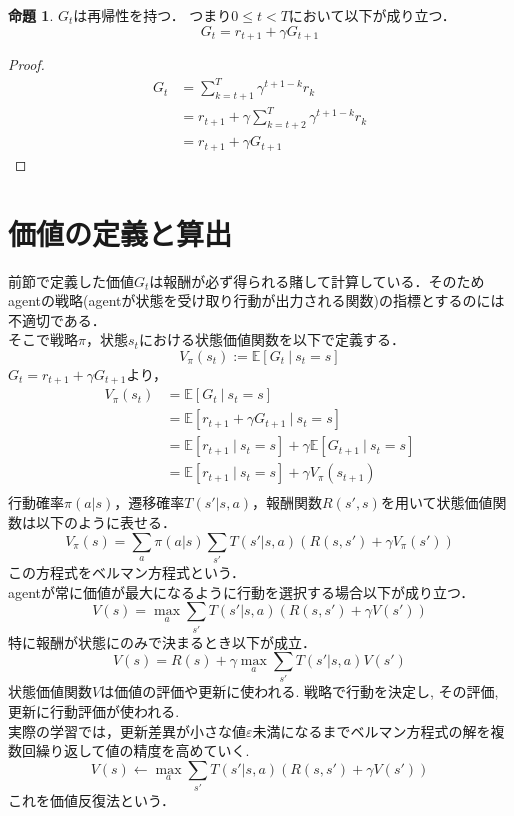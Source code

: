\documentclass[a4paper,12pt]{jsreport}
\theoremstyle{definition}
\newtheorem{prop}{命題}
\begin{document}
\begin{prop}
    $G_t$は再帰性を持つ．
    つまり$0\leq t<T$において以下が成り立つ．
    \begin{equation}
        G_t=r_{t+1}+\gamma G_{t+1}
    \end{equation}
\end{prop}

\begin{proof}  
    \begin{align}
        G_t&=\sum_{k=t+1}^T \gamma^{t+1-k} r_k\\
        &=r_{t+1}+\gamma\sum_{k=t+2}^T \gamma^{t+1-k} r_k\\
        &=r_{t+1}+\gamma G_{t+1}
    \end{align}
\end{proof}

\section{価値の定義と算出}
前節で定義した価値$G_t$は報酬が必ず得られる賭して計算している．そのためagentの戦略(agentが状態を受け取り行動が出力される関数)の指標とするのには不適切である．\\
そこで戦略$\pi$，状態$s_t$における状態価値関数を以下で定義する．
\begin{equation}
    V_\pi(s_t):=\mathbb{E}[G_t\ |\ s_t=s]
\end{equation}
$G_t=r_{t+1}+\gamma G_{t+1}$より，
\begin{align}
    V_\pi(s_t)&=\mathbb{E}[G_t\ |\ s_t=s]\\
    &=\mathbb{E}[r_{t+1}+\gamma G_{t+1}\ |\ s_t=s]\\
    &=\mathbb{E}[r_{t+1}\ |\ s_t=s]+\gamma\mathbb{E}[G_{t+1}\ |\ s_t=s]\\
    &=\mathbb{E}[r_{t+1}\ |\ s_t=s]+\gamma V_\pi (s_{t+1})\\
\end{align}
行動確率$\pi(a|s)$，遷移確率$T(s'|s,a)$，報酬関数$R(s',s)$を用いて状態価値関数は以下のように表せる．
\begin{equation}
    V_\pi(s)=\sum_a\pi(a|s)\sum_{s'}T(s'|s,a)(R(s,s')+\gamma V_\pi(s'))
\end{equation}
この方程式をベルマン方程式という．\\
agentが常に価値が最大になるように行動を選択する場合以下が成り立つ．
\begin{equation}
    V(s)=\max_a\sum_{s'}T(s'|s,a)(R(s,s')+\gamma V(s'))
\end{equation}
特に報酬が状態にのみで決まるとき以下が成立．
\begin{equation}
    V(s)=R(s)+\gamma\max_a\sum_{s'}T(s'|s,a)V(s')
\end{equation}
状態価値関数$V$は価値の評価や更新に使われる.
戦略で行動を決定し, その評価, 更新に行動評価が使われる.\\
実際の学習では，更新差異が小さな値$\varepsilon$未満になるまでベルマン方程式の解を複数回繰り返して値の精度を高めていく.
\begin{equation}
    V(s)\leftarrow\max_a\sum_{s'}T(s'|s,a)(R(s,s')+\gamma V(s'))
\end{equation}
これを価値反復法という．
\end{document}
